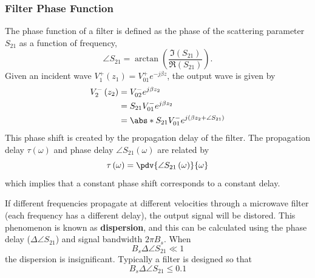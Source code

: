 \documentclass{article}
\begin{document}
\subsubsection{Filter Phase Function}
The phase function of a filter is defined as the phase of the scattering
parameter \(S_{21}\) as a function of frequency,
\begin{equation*}
    \angle S_{21} = \arctan{\left( \frac{\Im{\left( S_{21} \right)}}{\Re{\left( S_{21} \right)}} \right)}.
\end{equation*}
Given an incident wave \(V_1^+ \left( z_1 \right) = V_{01}^+ e^{-j \beta z}\),
the output wave is given by
\begin{align*}
    V_2^- \left( z_2 \right) & = V_{02}^- e^{j \beta z_2} \\
                             & = S_{21} V_{01}^- e^{j \beta z_2} \\
                             & = \abs*{S_{21}} V_{01}^- e^{j \left( \beta z_2 + \angle S_{21} \right)}
\end{align*}
This phase shift is created by the propagation delay of the filter.
The propagation delay \(\tau\left( \omega \right)\) and phase delay
\(\angle S_{21}\left( \omega \right)\) are related by
\begin{equation*}
    \tau\left( \omega \right) = \pdv{\angle S_{21}\left( \omega \right)}{\omega}
\end{equation*}
which implies that a constant phase shift corresponds to a constant delay.

If different frequencies propagate at different velocities through a
microwave filter (each frequency has a different delay), the output
signal will be distored. This phenomenon is known as \textbf{dispersion},
and this can be calculated using the phase delay
(\(\Delta \angle S_{21}\)) and signal bandwidth \(2\pi B_s\). When
\begin{equation*}
    B_s \Delta \angle S_{21} \ll 1
\end{equation*}
the dispersion is insignificant. Typically a filter is designed so that
\begin{equation*}
    B_s \Delta \angle S_{21} \leqslant 0.1
\end{equation*}
\end{document}
